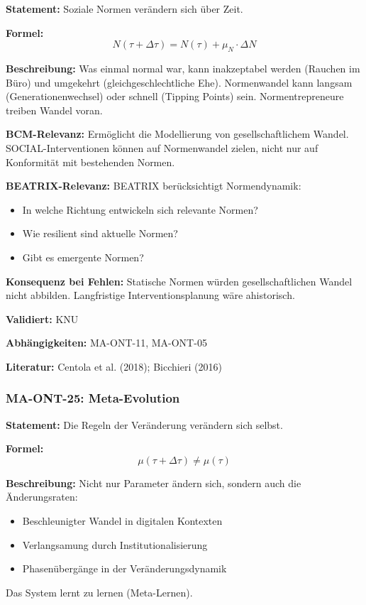 \textbf{Statement:} Soziale Normen verändern sich über Zeit.

\textbf{Formel:}
\begin{equation}
N(\tau + \Delta\tau) = N(\tau) + \mu_N \cdot \Delta N
\end{equation}

\textbf{Beschreibung:}
Was einmal normal war, kann inakzeptabel werden (Rauchen im Büro) und umgekehrt (gleichgeschlechtliche Ehe). Normenwandel kann langsam (Generationenwechsel) oder schnell (Tipping Points) sein. Normentrepreneure treiben Wandel voran.

\textbf{BCM-Relevanz:}
Ermöglicht die Modellierung von gesellschaftlichem Wandel. SOCIAL-Interventionen können auf Normenwandel zielen, nicht nur auf Konformität mit bestehenden Normen.

\textbf{BEATRIX-Relevanz:}
BEATRIX berücksichtigt Normendynamik:
\begin{itemize}
    \item In welche Richtung entwickeln sich relevante Normen?
    \item Wie resilient sind aktuelle Normen?
    \item Gibt es emergente Normen?
\end{itemize}

\textbf{Konsequenz bei Fehlen:}
Statische Normen würden gesellschaftlichen Wandel nicht abbilden. Langfristige Interventionsplanung wäre ahistorisch.

\textbf{Validiert:} KNU

\textbf{Abhängigkeiten:} MA-ONT-11, MA-ONT-05

\textbf{Literatur:} Centola et al. (2018); Bicchieri (2016)


\subsubsection*{MA-ONT-25: Meta-Evolution}

\textbf{Statement:} Die Regeln der Veränderung verändern sich selbst.

\textbf{Formel:}
\begin{equation}
\mu(\tau + \Delta\tau) \neq \mu(\tau)
\end{equation}

\textbf{Beschreibung:}
Nicht nur Parameter ändern sich, sondern auch die Änderungsraten:
\begin{itemize}
    \item Beschleunigter Wandel in digitalen Kontexten
    \item Verlangsamung durch Institutionalisierung
    \item Phasenübergänge in der Veränderungsdynamik
\end{itemize}
Das System lernt zu lernen (Meta-Lernen).

